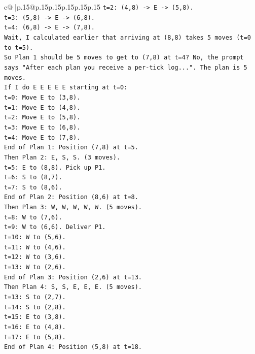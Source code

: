 \documentclass{article}
\begin{document}
{\begin{supertabular}{c@{$\;$}|p{.15\linewidth}@{}p{.15\linewidth}p{.15\linewidth}p{.15\linewidth}p{.15\linewidth}p{.15\linewidth}}
{{{\texttt{t=2: (4,8) {-}> E {-}> (5,8).} \\
\texttt{t=3: (5,8) {-}> E {-}> (6,8).} \\
\texttt{t=4: (6,8) {-}> E {-}> (7,8).} \\
\texttt{Wait, I calculated earlier that arriving at (8,8) takes 5 moves (t=0 to t=5).} \\
\texttt{So Plan 1 should be 5 moves to get to (7,8) at t=4? No, the prompt says "After each plan you receive a per{-}tick log...". The plan is 5 moves.} \\
\texttt{If I do E E E E E starting at t=0:} \\
\texttt{t=0: Move E to (3,8).} \\
\texttt{t=1: Move E to (4,8).} \\
\texttt{t=2: Move E to (5,8).} \\
\texttt{t=3: Move E to (6,8).} \\
\texttt{t=4: Move E to (7,8).} \\
\texttt{End of Plan 1: Position (7,8) at t=5.} \\
\texttt{Then Plan 2: E, S, S. (3 moves).} \\
\texttt{t=5: E to (8,8). Pick up P1.} \\
\texttt{t=6: S to (8,7).} \\
\texttt{t=7: S to (8,6).} \\
\texttt{End of Plan 2: Position (8,6) at t=8.} \\
\texttt{Then Plan 3: W, W, W, W, W. (5 moves).} \\
\texttt{t=8: W to (7,6).} \\
\texttt{t=9: W to (6,6). Deliver P1.} \\
\texttt{t=10: W to (5,6).} \\
\texttt{t=11: W to (4,6).} \\
\texttt{t=12: W to (3,6).} \\
\texttt{t=13: W to (2,6).} \\
\texttt{End of Plan 3: Position (2,6) at t=13.} \\
\texttt{Then Plan 4: S, S, E, E, E. (5 moves).} \\
\texttt{t=13: S to (2,7).} \\
\texttt{t=14: S to (2,8).} \\
\texttt{t=15: E to (3,8).} \\
\texttt{t=16: E to (4,8).} \\
\texttt{t=17: E to (5,8).} \\
\texttt{End of Plan 4: Position (5,8) at t=18.} \\
}}}
\end{supertabular}}
\end{document}
